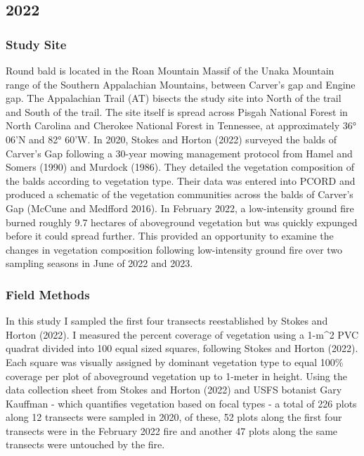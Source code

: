 \documentclass[
]{article}
\begin{document}
\hypertarget{section}{%
\subsection{2022}\label{section}}

\hypertarget{study-site}{%
\subsubsection{Study Site}\label{study-site}}

Round bald is located in the Roan Mountain Massif of the Unaka Mountain range of the Southern Appalachian Mountains, between Carver's gap and Engine gap. The Appalachian Trail (AT) bisects the study site into North of the trail and South of the trail. The site itself is spread across Pisgah National Forest in North Carolina and Cherokee National Forest in Tennessee, at approximately 36° 06'N and 82° 60'W. In 2020, Stokes and Horton (2022) surveyed the balds of Carver's Gap following a 30-year mowing management protocol from Hamel and Somers (1990) and Murdock (1986). They detailed the vegetation composition of the balds according to vegetation type. Their data was entered into PCORD and produced a schematic of the vegetation communities across the balds of Carver's Gap (McCune and Medfford 2016). In February 2022, a low-intensity ground fire burned roughly 9.7 hectares of aboveground vegetation but was quickly expunged before it could spread further. This provided an opportunity to examine the changes in vegetation composition following low-intensity ground fire over two sampling seasons in June of 2022 and 2023.

\hypertarget{field-methods}{%
\subsubsection{Field Methods}\label{field-methods}}

In this study I sampled the first four transects reestablished by Stokes and Horton (2022). I measured the percent coverage of vegetation using a 1-m\^{}2 PVC quadrat divided into 100 equal sized squares, following Stokes and Horton (2022). Each square was visually assigned by dominant vegetation type to equal 100\% coverage per plot of aboveground vegetation up to 1-meter in height. Using the data collection sheet from Stokes and Horton (2022) and USFS botanist Gary Kauffman - which quantifies vegetation based on focal types - a total of 226 plots along 12 transects were sampled in 2020, of these, 52 plots along the first four transects were in the February 2022 fire and another 47 plots along the same transects were untouched by the fire.
\end{document}
